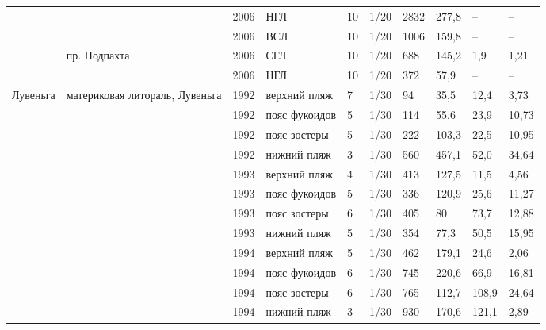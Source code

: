 \begin{footnotesize}
\begin{center}
\begin{longtable}{|p{1.6cm}|p{2.3cm}|p{0.8cm}|p{1.8cm}|p{1.1cm}|p{1.1cm}|*{4}{p{1cm}|}}
                   &                                & 2006 & НГЛ               & 10   & 1/20 & 2832 & 277,8  & --    & --    \\
                   &                                & 2006 & ВСЛ               & 10   & 1/20 & 1006 & 159,8  & --    & --    \\\cline{2-10}
                   & пр. Подпахта                   & 2006 & СГЛ               & 10   & 1/20 & 688  & 145,2  & 1,9   & 1,21  \\
                   &                                & 2006 & НГЛ               & 10   & 1/20 & 372  & 57,9   & --    & --    \\ \hline
Лувеньга           & материковая литораль, Лувеньга & 1992 & верхний пляж      & 7    & 1/30 & 94   & 35,5   & 12,4  & 3,73  \\
                   &                                & 1992 & пояс фукоидов     & 5    & 1/30 & 114  & 55,6   & 23,9  & 10,73 \\
                   &                                & 1992 & пояс зостеры      & 5    & 1/30 & 222  & 103,3  & 22,5  & 10,95 \\
                   &                                & 1992 & нижний пляж       & 3    & 1/30 & 560  & 457,1  & 52,0  & 34,64 \\
                   &                                & 1993 & верхний пляж      & 4    & 1/30 & 413  & 127,5  & 11,5  & 4,56  \\
                   &                                & 1993 & пояс фукоидов     & 5    & 1/30 & 336  & 120,9  & 25,6  & 11,27 \\
                   &                                & 1993 & пояс зостеры      & 6    & 1/30 & 405  & 80     & 73,7  & 12,88 \\
                   &                                & 1993 & нижний пляж       & 5    & 1/30 & 354  & 77,3   & 50,5  & 15,95 \\
                   &                                & 1994 & верхний пляж      & 5    & 1/30 & 462  & 179,1  & 24,6  & 2,06  \\
                   &                                & 1994 & пояс фукоидов     & 6    & 1/30 & 745  & 220,6  & 66,9  & 16,81 \\
                   &                                & 1994 & пояс зостеры      & 6    & 1/30 & 765  & 112,7  & 108,9 & 24,64 \\
                   &                                & 1994 & нижний пляж       & 3    & 1/30 & 930  & 170,6  & 121,1 & 2,89  \\

\end{longtable}
\end{center}
\end{footnotesize}
